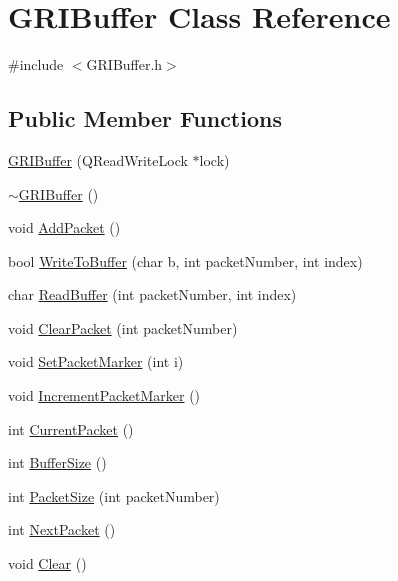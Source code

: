\hypertarget{classGRIBuffer}{\section{\-G\-R\-I\-Buffer \-Class \-Reference}
\label{classGRIBuffer}
}


{\ttfamily \#include $<$\-G\-R\-I\-Buffer.\-h$>$}

\subsection*{\-Public \-Member \-Functions}
\begin{DoxyCompactItemize}
\item 
\hyperlink{classGRIBuffer_af16e41e4b01f8ddad0b2649c410bdbcd}{\-G\-R\-I\-Buffer} (\-Q\-Read\-Write\-Lock $\ast$lock)
\item 
\hyperlink{classGRIBuffer_a1be75d85746f6d997879f781d5050246}{$\sim$\-G\-R\-I\-Buffer} ()
\item 
void \hyperlink{classGRIBuffer_a88cf91ba82efd1bb2409c60b918c2c1a}{\-Add\-Packet} ()
\item 
bool \hyperlink{classGRIBuffer_aa2a50c2dde7c7ee247d467ced3a1925b}{\-Write\-To\-Buffer} (char b, int packet\-Number, int index)
\item 
char \hyperlink{classGRIBuffer_a73a11a959edfefa57114799881c84dd0}{\-Read\-Buffer} (int packet\-Number, int index)
\item 
void \hyperlink{classGRIBuffer_a6ee5e7a16cb617252915afe14a491a54}{\-Clear\-Packet} (int packet\-Number)
\item 
void \hyperlink{classGRIBuffer_ae7fbe6668bd34759bca6128c87a894d3}{\-Set\-Packet\-Marker} (int i)
\item 
void \hyperlink{classGRIBuffer_a556ed4cdbcd951301928bb86bf3b32dd}{\-Increment\-Packet\-Marker} ()
\item 
int \hyperlink{classGRIBuffer_a9920b5a336f5f5d60341793b8c6c15e8}{\-Current\-Packet} ()
\item 
int \hyperlink{classGRIBuffer_aa5550798986f0d862e997ee67b1a43ad}{\-Buffer\-Size} ()
\item 
int \hyperlink{classGRIBuffer_a50682ebe28f0665ae2b12bc0f6b81560}{\-Packet\-Size} (int packet\-Number)
\item 
int \hyperlink{classGRIBuffer_ad0ed3ee5616303d1c3159a366584b4bf}{\-Next\-Packet} ()
\item 
void \hyperlink{classGRIBuffer_a0a84407e6680fdba0a05381c7a98c0ab}{\-Clear} ()
\item 

\end{DoxyCompactItemize}

